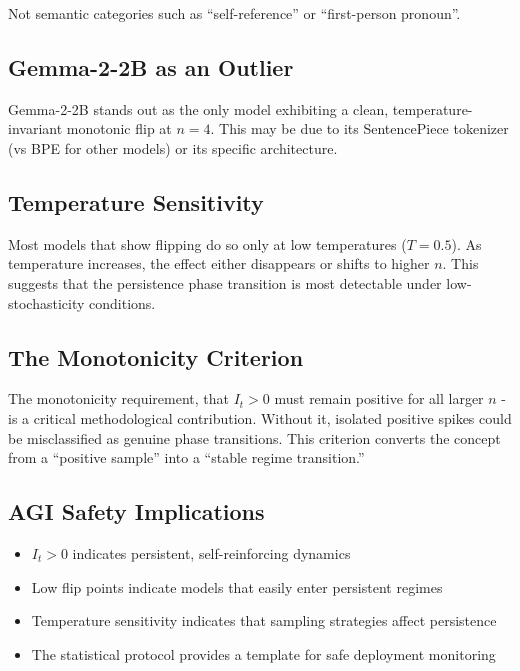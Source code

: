 \documentclass[12pt,a4paper]{article}
\begin{document}
Not semantic categories such as ``self-reference'' or ``first-person pronoun''.

\subsection{Gemma-2-2B as an Outlier}

Gemma-2-2B stands out as the only model exhibiting a clean, temperature-invariant monotonic flip at $n=4$. This may be due to its SentencePiece tokenizer (vs BPE for other models) or its specific architecture.

\subsection{Temperature Sensitivity}

Most models that show flipping do so only at low temperatures ($T=0.5$). As temperature increases, the effect either disappears or shifts to higher $n$. This suggests that the persistence phase transition is most detectable under low-stochasticity conditions.

\subsection{The Monotonicity Criterion}

The monotonicity requirement, that $I_t > 0$ must remain positive for all larger $n$ - is a critical methodological contribution. Without it, isolated positive spikes could be misclassified as genuine phase transitions. This criterion converts the concept from a ``positive sample'' into a ``stable regime transition.''

\subsection{AGI Safety Implications}

\begin{itemize}[noitemsep]
    \item $I_t > 0$ indicates persistent, self-reinforcing dynamics
    \item Low flip points indicate models that easily enter persistent regimes
    \item Temperature sensitivity indicates that sampling strategies affect persistence
    \item The statistical protocol provides a template for safe deployment monitoring
\end{itemize}
\end{document}
